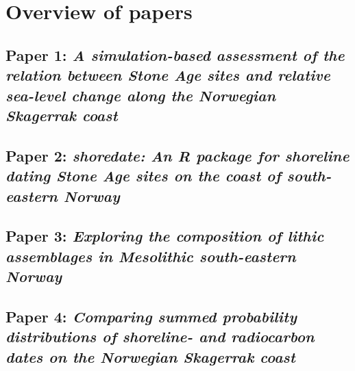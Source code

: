 \documentclass[
  oneside]{book}
\begin{document}
\hypertarget{overview-of-papers}{%
\section{Overview of papers}\label{overview-of-papers}}

\hypertarget{paper-1-a-simulation-based-assessment-of-the-relation-between-stone-age-sites-and-relative-sea-level-change-along-the-norwegian-skagerrak-coast}{%
\subsection{\texorpdfstring{Paper 1: \emph{A simulation-based assessment of the relation between Stone Age sites and relative sea-level change along the Norwegian Skagerrak coast}}{Paper 1: A simulation-based assessment of the relation between Stone Age sites and relative sea-level change along the Norwegian Skagerrak coast}}\label{paper-1-a-simulation-based-assessment-of-the-relation-between-stone-age-sites-and-relative-sea-level-change-along-the-norwegian-skagerrak-coast}}

\hypertarget{paper-2-shoredate-an-r-package-for-shoreline-dating-stone-age-sites-on-the-coast-of-south-eastern-norway}{%
\subsection{\texorpdfstring{Paper 2: \emph{shoredate: An R package for shoreline dating Stone Age sites on the coast of south-eastern Norway}}{Paper 2: shoredate: An R package for shoreline dating Stone Age sites on the coast of south-eastern Norway}}\label{paper-2-shoredate-an-r-package-for-shoreline-dating-stone-age-sites-on-the-coast-of-south-eastern-norway}}

\hypertarget{paper-3-exploring-the-composition-of-lithic-assemblages-in-mesolithic-south-eastern-norway}{%
\subsection{\texorpdfstring{Paper 3: \emph{Exploring the composition of lithic assemblages in Mesolithic south-eastern Norway}}{Paper 3: Exploring the composition of lithic assemblages in Mesolithic south-eastern Norway}}\label{paper-3-exploring-the-composition-of-lithic-assemblages-in-mesolithic-south-eastern-norway}}

\hypertarget{paper-4-comparing-summed-probability-distributions-of-shoreline--and-radiocarbon-dates-on-the-norwegian-skagerrak-coast}{%
\subsection{\texorpdfstring{Paper 4: \emph{Comparing summed probability distributions of shoreline- and radiocarbon dates on the Norwegian Skagerrak coast}}{Paper 4: Comparing summed probability distributions of shoreline- and radiocarbon dates on the Norwegian Skagerrak coast}}\label{paper-4-comparing-summed-probability-distributions-of-shoreline--and-radiocarbon-dates-on-the-norwegian-skagerrak-coast}}
\end{document}
